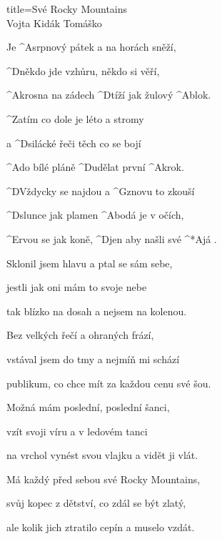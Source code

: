 \begin{song}{title=\predtitle\centering Své Rocky Mountains \\\large Vojta Kidák Tomáško  \vspace*{-0.3cm}}  %
\begin{centerjustified}

\sloka 
	Je ^{A\z}srpnový pátek a na horách sněží,

	^{D\z}někdo jde vzhůru, někdo si věří,
	
	^{A\z}krosna na zádech ^{D}tíží jak žulový ^{A\z}blok.
	
	^{\phantom{.}}Zatím co dole je léto a stromy
	
	a ^{D\z}silácké řeči těch co se bojí
	
	^{A}do bílé pláně ^{D\z}udělat první ^{A\z}krok.

	^{D\z}Vždycky se najdou a ^{G\z}znovu to zkouší
	
	^{D\z}slunce jak plamen ^{A\z}bodá je v očích,
	
	^{E\z}rvou se jak koně, ^{D}jen aby našli své ^*{A}já .

\sloka	
	Sklonil jsem hlavu a ptal se sám sebe,
	
	jestli jak oni mám to svoje nebe
	
	tak blízko na dosah a nejsem na kolenou.
	
	Bez velkých řečí a ohraných frází,
	
	vstával jsem do tmy a nejmíň mi schází
	
	publikum, co chce mít za každou cenu své šou.


\sloka
	Možná mám poslední, poslední šanci,
	
	vzít svoji víru a v ledovém tanci
	
	na vrchol vynést svou vlajku a vidět ji vlát.
	
	Má každý před sebou své Rocky Mountains,
	
	svůj kopec z dětství, co zdál se být zlatý,
	
	ale kolik jich ztratilo cepín a muselo vzdát. 




\end{centerjustified}
\setcounter{Slokočet}{0}
\end{song}
